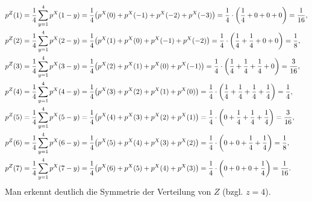 \documentclass{exercise}
\begin{document}
    \begin{align*}
        p^Z\parentheses*{1} &= \frac{1}{4}\sum_{y = 1}^4 p^X\parentheses*{1 - y} = \frac{1}{4}\parentheses*{p^X\parentheses*{0} + p^X\parentheses*{-1} + p^X\parentheses*{-2} + p^X\parentheses*{-3}} = \frac{1}{4} \cdot \parentheses*{\frac{1}{4} + 0 + 0 + 0} = \frac{1}{16},\\
        p^Z\parentheses*{2} &= \frac{1}{4}\sum_{y = 1}^4 p^X\parentheses*{2 - y} = \frac{1}{4}\parentheses*{p^X\parentheses*{1} + p^X\parentheses*{0} + p^X\parentheses*{-1} + p^X\parentheses*{-2}} = \frac{1}{4} \cdot \parentheses*{\frac{1}{4} + \frac{1}{4} + 0 + 0} = \frac{1}{8},\\
        p^Z\parentheses*{3} &= \frac{1}{4}\sum_{y = 1}^4 p^X\parentheses*{3 - y} = \frac{1}{4}\parentheses*{p^X\parentheses*{2} + p^X\parentheses*{1} + p^X\parentheses*{0} + p^X\parentheses*{-1}} = \frac{1}{4} \cdot \parentheses*{\frac{1}{4} + \frac{1}{4} + \frac{1}{4} + 0} = \frac{3}{16},\\
        p^Z\parentheses*{4} &= \frac{1}{4}\sum_{y = 1}^4 p^X\parentheses*{4 - y} = \frac{1}{4}\parentheses*{p^X\parentheses*{3} + p^X\parentheses*{2} + p^X\parentheses*{1} + p^X\parentheses*{0}} = \frac{1}{4} \cdot \parentheses*{\frac{1}{4} + \frac{1}{4} + \frac{1}{4} + \frac{1}{4}} = \frac{1}{4},\\
        p^Z\parentheses*{5} &= \frac{1}{4}\sum_{y = 1}^4 p^X\parentheses*{5 - y} = \frac{1}{4}\parentheses*{p^X\parentheses*{4} + p^X\parentheses*{3} + p^X\parentheses*{2} + p^X\parentheses*{1}} = \frac{1}{4} \cdot \parentheses*{0 + \frac{1}{4} + \frac{1}{4} + \frac{1}{4}} = \frac{3}{16},\\
        p^Z\parentheses*{6} &= \frac{1}{4}\sum_{y = 1}^4 p^X\parentheses*{6 - y} = \frac{1}{4}\parentheses*{p^X\parentheses*{5} + p^X\parentheses*{4} + p^X\parentheses*{3} + p^X\parentheses*{2}} = \frac{1}{4} \cdot \parentheses*{0 + 0 + \frac{1}{4} + \frac{1}{4}} = \frac{1}{8},\\
        p^Z\parentheses*{7} &= \frac{1}{4}\sum_{y = 1}^4 p^X\parentheses*{7 - y} = \frac{1}{4}\parentheses*{p^X\parentheses*{6} + p^X\parentheses*{5} + p^X\parentheses*{4} + p^X\parentheses*{3}} = \frac{1}{4} \cdot \parentheses*{0 + 0 + 0 + \frac{1}{4}} = \frac{1}{16}.
    \end{align*}
    Man erkennt deutlich die Symmetrie der Verteilung von \(Z\) (bzgl. \(z = 4\)).
\end{document}
